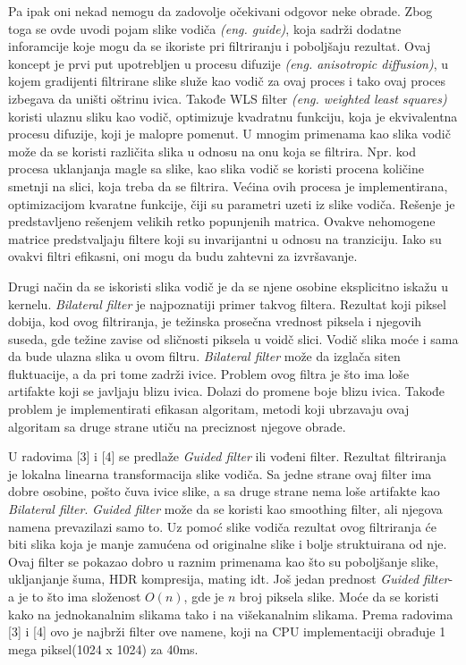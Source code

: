 \documentclass[a4paper,12pt,titlepage]{article}
\begin{document}
Pa ipak oni nekad nemogu da zadovolje očekivani odgovor neke obrade. Zbog toga se ovde uvodi pojam slike vodiča \emph{(eng. guide)}, koja sadrži dodatne inforamcije koje mogu da se ikoriste pri filtriranju i poboljšaju rezultat. Ovaj koncept je prvi put upotrebljen u procesu difuzije \emph{(eng. anisotropic diffusion)}, u kojem gradijenti filtrirane slike služe kao vodič za ovaj proces i tako ovaj proces izbegava da uništi oštrinu ivica. Takođe WLS filter \emph{(eng. weighted least squares)} koristi ulaznu sliku kao vodič, optimizuje kvadratnu funkciju, koja je ekvivalentna procesu difuzije, koji je malopre pomenut. U mnogim primenama kao slika vodič može da se koristi različita slika u odnosu na onu koja se filtrira. Npr. kod procesa uklanjanja magle sa slike, kao slika vodič se koristi procena količine smetnji na slici, koja treba da se filtrira. Većina ovih procesa je implementirana, optimizacijom kvaratne funkcije, čiji su parametri uzeti iz slike vodiča. Rešenje je predstavljeno rešenjem velikih retko popunjenih matrica. Ovakve nehomogene matrice predstvaljaju filtere koji su invarijantni u odnosu na tranziciju. Iako su ovakvi filtri efikasni, oni mogu da budu zahtevni za izvršavanje.

Drugi način da se iskoristi slika vodič je da se njene osobine eksplicitno iskažu u kernelu. \emph{Bilateral filter} je najpoznatiji primer takvog filtera. Rezultat koji piksel dobija, kod ovog filtriranja, je težinska prosečna vrednost piksela i njegovih suseda, gde težine zavise od sličnosti piksela u voidč slici. Vodič slika moće i sama da bude ulazna slika u ovom filtru. \emph{Bilateral filter} može da izglača siten fluktuacije, a da pri tome zadrži ivice. Problem ovog filtra je što ima loše artifakte koji se javljaju blizu ivica. Dolazi do promene boje blizu ivica. Takođe problem je implementirati efikasan algoritam, metodi koji ubrzavaju ovaj algoritam sa druge strane utiču na preciznost njegove obrade.

U radovima [3] i [4] se predlaže \emph{Guided filter} ili vođeni filter. Rezultat filtriranja je lokalna linearna transformacija slike vodiča. Sa jedne strane ovaj filter ima dobre osobine, pošto čuva ivice slike, a sa druge strane nema loše artifakte kao \emph{Bilateral filter}. \emph{Guided filter} može da se koristi kao smoothing filter, ali njegova namena prevazilazi samo to. Uz pomoć slike vodiča rezultat ovog filtriranja će biti slika koja je manje zamućena od originalne slike i bolje struktuirana od nje. Ovaj filter se pokazao dobro u raznim primenama kao što su poboljšanje slike, ukljanjanje šuma, HDR kompresija, mating idt. Još jedan prednost \emph{Guided filter}-a je to što ima složenost $O(n)$, gde je $n$ broj piksela slike. Moće da se koristi kako na jednokanalnim slikama tako i na višekanalnim slikama. Prema radovima [3] i [4] ovo je najbrži filter ove namene, koji na CPU implementaciji obrađuje 1 mega piksel(1024 x 1024) za 40ms. 
\end{document}

